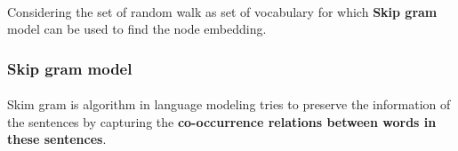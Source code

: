 \paragraph{} Considering the set of random walk as set of vocabulary for which \textbf{Skip gram} model can be used to find the node embedding.
\subsubsection{Skip gram model}
\paragraph{} Skim gram is algorithm in language modeling tries to preserve the information of the sentences by capturing the \textbf{co-occurrence relations between words in these sentences}.


    
